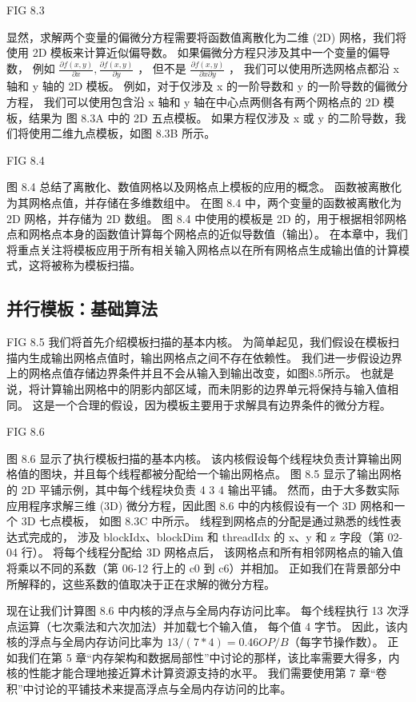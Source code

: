 {\color{red} FIG 8.3}

显然，求解两个变量的偏微分方程需要将函数值离散化为二维 (2D) 网格，我们将使用 2D 模板来计算近似偏导数。 
如果偏微分方程只涉及其中一个变量的偏导数，
例如 $\frac{\partial f(x, y)}{\partial x}, \frac{\partial f(x, y)}{\partial y}$ ，
但不是 $\frac{\partial f(x, y)}{\partial x \partial y}$ ，
我们可以使用所选网格点都沿 x 轴和 y 轴的 2D 模板。 例如，对于仅涉及 x 的一阶导数和 y 的一阶导数的偏微分方程，
我们可以使用包含沿 x 轴和 y 轴在中心点两侧各有两个网格点的 2D 模板，结果为 图 8.3A 中的 2D 五点模板。 
如果方程仅涉及 x 或 y 的二阶导数，我们将使用二维九点模板，如图 8.3B 所示。

{\color{red} FIG 8.4}

图 8.4 总结了离散化、数值网格以及网格点上模板的应用的概念。 函数被离散化为其网格点值，并存储在多维数组中。 
在图 8.4 中，两个变量的函数被离散化为 2D 网格，并存储为 2D 数组。 
图 8.4 中使用的模板是 2D 的，用于根据相邻网格点和网格点本身的函数值计算每个网格点的近似导数值（输出）。 
在本章中，我们将重点关注将模板应用于所有相关输入网格点以在所有网格点生成输出值的计算模式，这将被称为模板扫描。

\subsection{并行模板：基础算法}
{\color{red} FIG 8.5}
我们将首先介绍模板扫描的基本内核。 为简单起见，我们假设在模板扫描内生成输出网格点值时，输出网格点之间不存在依赖性。 
我们进一步假设边界上的网格点值存储边界条件并且不会从输入到输出改变，如图8.5所示。 
也就是说，将计算输出网格中的阴影内部区域，而未阴影的边界单元将保持与输入值相同。 
这是一个合理的假设，因为模板主要用于求解具有边界条件的微分方程。

{\color{red} FIG 8.6}

图 8.6 显示了执行模板扫描的基本内核。 该内核假设每个线程块负责计算输出网格值的图块，并且每个线程都被分配给一个输出网格点。 
图 8.5 显示了输出网格的 2D 平铺示例，其中每个线程块负责 4 3 4 输出平铺。 
然而，由于大多数实际应用程序求解三维 (3D) 微分方程，因此图 8.6 中的内核假设有一个 3D 网格和一个 3D 七点模板，
如图 8.3C 中所示。 线程到网格点的分配是通过熟悉的线性表达式完成的，
涉及 blockIdx、blockDim 和 threadIdx 的 x、y 和 z 字段（第 02-04 行）。 将每个线程分配给 3D 网格点后，
该网格点和所有相邻网格点的输入值将乘以不同的系数（第 06-12 行上的 c0 到 c6）并相加。 
正如我们在背景部分中所解释的，这些系数的值取决于正在求解的微分方程。

现在让我们计算图 8.6 中内核的浮点与全局内存访问比率。 每个线程执行 13 次浮点运算（七次乘法和六次加法）并加载七个输入值，
每个值 4 字节。 因此，该内核的浮点与全局内存访问比率为 $13/(7 * 4) = 0.46 OP/B$（每字节操作数）。 
正如我们在第 5 章“内存架构和数据局部性”中讨论的那样，该比率需要大得多，内核的性能才能合理地接近算术计算资源支持的水平。 
我们需要使用第 7 章“卷积”中讨论的平铺技术来提高浮点与全局内存访问的比率。

